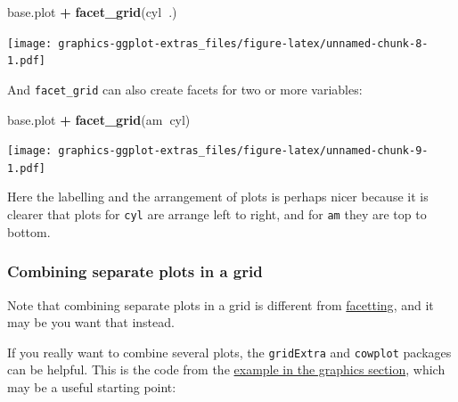 \documentclass[]{article}
\newenvironment{Shaded}{\begin{snugshade}}{\end{snugshade}}
\newcommand{\KeywordTok}[1]{\textcolor[rgb]{0.13,0.29,0.53}{\textbf{#1}}}
\newcommand{\NormalTok}[1]{#1}
\newcommand{\OperatorTok}[1]{\textcolor[rgb]{0.81,0.36,0.00}{\textbf{#1}}}
\newcommand{\StringTok}[1]{\textcolor[rgb]{0.31,0.60,0.02}{#1}}
\begin{document}
\begin{Shaded}
\begin{Highlighting}[]
\NormalTok{base.plot }\OperatorTok{+}\StringTok{ }\KeywordTok{facet_grid}\NormalTok{(cyl}\OperatorTok{~}\NormalTok{.)}
\end{Highlighting}
\end{Shaded}

\texttt{[image: graphics-ggplot-extras\_files/figure-latex/unnamed-chunk-8-1.pdf]}

And \texttt{facet\_grid} can also create facets for two or more variables:

\begin{Shaded}
\begin{Highlighting}[]
\NormalTok{base.plot }\OperatorTok{+}\StringTok{ }\KeywordTok{facet_grid}\NormalTok{(am}\OperatorTok{~}\NormalTok{cyl)}
\end{Highlighting}
\end{Shaded}

\texttt{[image: graphics-ggplot-extras\_files/figure-latex/unnamed-chunk-9-1.pdf]}

Here the labelling and the arrangement of plots is perhaps nicer because it is
clearer that plots for \texttt{cyl} are arrange left to right, and for \texttt{am} they are
top to bottom.

\hypertarget{combining-plots}{%
\subsubsection*{Combining separate plots in a grid}\label{combining-plots}}

Note that combining separate plots in a grid is different from
\protect\hyperlink{facetting-plots}{facetting}, and it may be you want that instead.

If you really want to combine several plots, the \texttt{gridExtra} and \texttt{cowplot}
packages can be helpful. This is the code from the
\protect\hyperlink{layered-graphics}{example in the graphics section}, which may be a useful
starting point:
\end{document}
